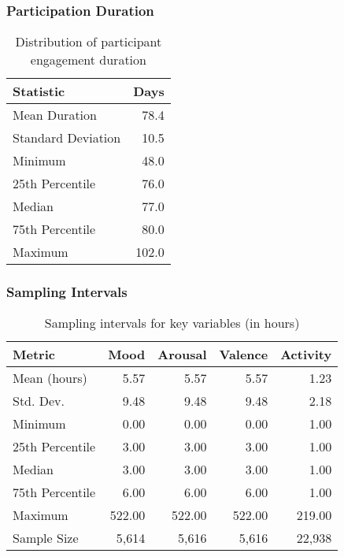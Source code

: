 \documentclass[11pt,a4paper]{article}
\begin{document}
\subsubsection{Participation Duration}
\begin{table}[h]
    \centering
    \begin{tabular}{lr}
        \toprule
        Statistic & Days \\
        \midrule
        Mean Duration & 78.4 \\
        Standard Deviation & 10.5 \\
        Minimum & 48.0 \\
        25th Percentile & 76.0 \\
        Median & 77.0 \\
        75th Percentile & 80.0 \\
        Maximum & 102.0 \\
        \bottomrule
    \end{tabular}
    \caption{Distribution of participant engagement duration}
    \label{tab:participation_duration}
\end{table}

\subsubsection{Sampling Intervals}
\begin{table}[h]
    \centering
    \begin{tabular}{lrrrr}
        \toprule
        Metric & Mood & Arousal & Valence & Activity \\
        \midrule
        Mean (hours) & 5.57 & 5.57 & 5.57 & 1.23 \\
        Std. Dev. & 9.48 & 9.48 & 9.48 & 2.18 \\
        Minimum & 0.00 & 0.00 & 0.00 & 1.00 \\
        25th Percentile & 3.00 & 3.00 & 3.00 & 1.00 \\
        Median & 3.00 & 3.00 & 3.00 & 1.00 \\
        75th Percentile & 6.00 & 6.00 & 6.00 & 1.00 \\
        Maximum & 522.00 & 522.00 & 522.00 & 219.00 \\
        Sample Size & 5,614 & 5,616 & 5,616 & 22,938 \\
        \bottomrule
    \end{tabular}
    \caption{Sampling intervals for key variables (in hours)}
    \label{tab:sampling_intervals}
\end{table}
\end{document}

